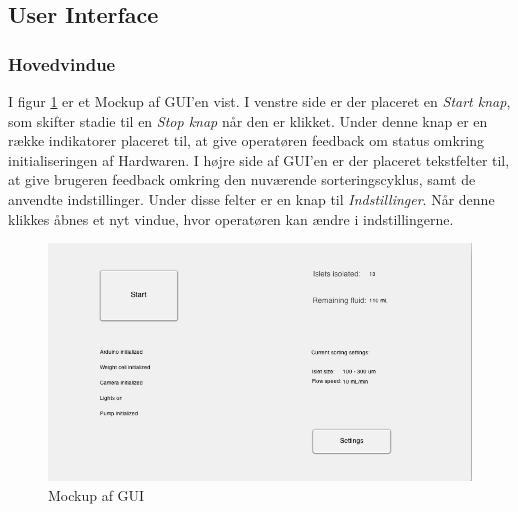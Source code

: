 \subsection{User Interface}
\subsubsection{Hovedvindue}
I figur \ref{fig:gui} er et Mockup af GUI'en vist. I venstre side er der placeret en \textit{Start knap}, som skifter stadie til en \textit{Stop knap} når den er klikket. Under denne knap er en række indikatorer placeret til, at give operatøren feedback om status omkring initialiseringen af Hardwaren. 
I højre side af GUI'en er der placeret tekstfelter til, at give brugeren feedback omkring den nuværende sorteringscyklus, samt de anvendte indstillinger. Under disse felter er en knap til \textit{Indstillinger}. Når denne klikkes åbnes et nyt vindue, hvor operatøren kan ændre i indstillingerne. 
\begin{figure}[H]
	\centering
	\includegraphics[width=1\textwidth]{billeder/GUI.png}
	\caption{Mockup af GUI}
	\label{fig:gui}
\end{figure}

\newpage
